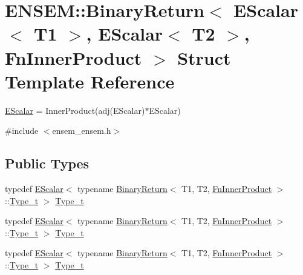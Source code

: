 \hypertarget{structENSEM_1_1BinaryReturn_3_01EScalar_3_01T1_01_4_00_01EScalar_3_01T2_01_4_00_01FnInnerProduct_01_4}{}\section{E\+N\+S\+EM\+:\+:Binary\+Return$<$ E\+Scalar$<$ T1 $>$, E\+Scalar$<$ T2 $>$, Fn\+Inner\+Product $>$ Struct Template Reference}
\label{structENSEM_1_1BinaryReturn_3_01EScalar_3_01T1_01_4_00_01EScalar_3_01T2_01_4_00_01FnInnerProduct_01_4}


\mbox{\hyperlink{classENSEM_1_1EScalar}{E\+Scalar}} = Inner\+Product(adj(\+E\+Scalar)$\ast$\+E\+Scalar)  




{\ttfamily \#include $<$ensem\+\_\+ensem.\+h$>$}

\subsection*{Public Types}
\begin{DoxyCompactItemize}
\item 
typedef \mbox{\hyperlink{classENSEM_1_1EScalar}{E\+Scalar}}$<$ typename \mbox{\hyperlink{structENSEM_1_1BinaryReturn}{Binary\+Return}}$<$ T1, T2, \mbox{\hyperlink{structENSEM_1_1FnInnerProduct}{Fn\+Inner\+Product}} $>$\+::\mbox{\hyperlink{structENSEM_1_1BinaryReturn_3_01EScalar_3_01T1_01_4_00_01EScalar_3_01T2_01_4_00_01FnInnerProduct_01_4_a873972feeb93fe2dbe766749aba076f1}{Type\+\_\+t}} $>$ \mbox{\hyperlink{structENSEM_1_1BinaryReturn_3_01EScalar_3_01T1_01_4_00_01EScalar_3_01T2_01_4_00_01FnInnerProduct_01_4_a873972feeb93fe2dbe766749aba076f1}{Type\+\_\+t}}
\item 
typedef \mbox{\hyperlink{classENSEM_1_1EScalar}{E\+Scalar}}$<$ typename \mbox{\hyperlink{structENSEM_1_1BinaryReturn}{Binary\+Return}}$<$ T1, T2, \mbox{\hyperlink{structENSEM_1_1FnInnerProduct}{Fn\+Inner\+Product}} $>$\+::\mbox{\hyperlink{structENSEM_1_1BinaryReturn_3_01EScalar_3_01T1_01_4_00_01EScalar_3_01T2_01_4_00_01FnInnerProduct_01_4_a873972feeb93fe2dbe766749aba076f1}{Type\+\_\+t}} $>$ \mbox{\hyperlink{structENSEM_1_1BinaryReturn_3_01EScalar_3_01T1_01_4_00_01EScalar_3_01T2_01_4_00_01FnInnerProduct_01_4_a873972feeb93fe2dbe766749aba076f1}{Type\+\_\+t}}
\item 
typedef \mbox{\hyperlink{classENSEM_1_1EScalar}{E\+Scalar}}$<$ typename \mbox{\hyperlink{structENSEM_1_1BinaryReturn}{Binary\+Return}}$<$ T1, T2, \mbox{\hyperlink{structENSEM_1_1FnInnerProduct}{Fn\+Inner\+Product}} $>$\+::\mbox{\hyperlink{structENSEM_1_1BinaryReturn_3_01EScalar_3_01T1_01_4_00_01EScalar_3_01T2_01_4_00_01FnInnerProduct_01_4_a873972feeb93fe2dbe766749aba076f1}{Type\+\_\+t}} $>$ \mbox{\hyperlink{structENSEM_1_1BinaryReturn_3_01EScalar_3_01T1_01_4_00_01EScalar_3_01T2_01_4_00_01FnInnerProduct_01_4_a873972feeb93fe2dbe766749aba076f1}{Type\+\_\+t}}
\end{DoxyCompactItemize}


